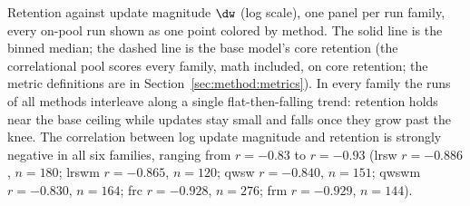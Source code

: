 \caption{Retention against update magnitude $\dw$ (log scale), one panel per
run family, every on-pool run shown as one point colored by method. The solid
line is the binned median; the dashed line is the base model's core
retention (the correlational pool scores every family, math included, on core
retention; the metric definitions are in Section~\ref{sec:method:metrics}). In
every family the runs of all methods interleave along a single flat-then-falling
trend: retention holds near the base ceiling while updates stay small and
falls once they grow past the knee. The correlation between log update
magnitude and retention is strongly negative in all six families, ranging
from $r=-0.83$ to $r=-0.93$
(lrsw $r=-0.886$, $n=180$; lrswm $r=-0.865$, $n=120$;
qwsw $r=-0.840$, $n=151$; qwswm $r=-0.830$, $n=164$;
frc $r=-0.928$, $n=276$; frm $r=-0.929$, $n=144$).}
\label{fig:family-scatter}
